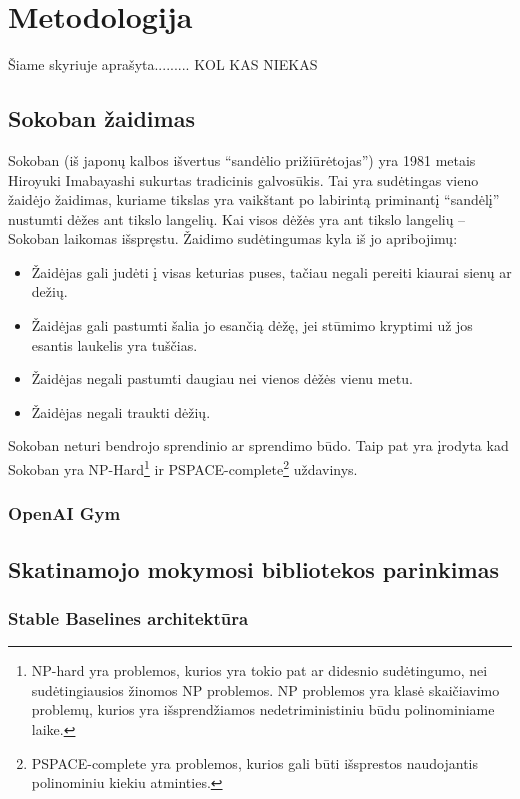 \documentclass{VUMIFPSbakalaurinis}
\begin{document}
\section{Metodologija}
{
	Šiame skyriuje aprašyta......... KOL KAS NIEKAS
}
\subsection{Sokoban žaidimas}
{
	Sokoban (iš japonų kalbos išvertus \enquote{sandėlio prižiūrėtojas}) yra 1981 metais Hiroyuki Imabayashi sukurtas tradicinis galvosūkis. Tai yra sudėtingas vieno žaidėjo žaidimas, kuriame tikslas yra vaikštant po labirintą priminantį \enquote{sandėlį} nustumti dėžes ant tikslo langelių. Kai visos dėžės yra ant tikslo langelių -- Sokoban laikomas išspręstu. Žaidimo sudėtingumas kyla iš jo apribojimų:
	\begin{itemize}
		\item Žaidėjas gali judėti į visas keturias puses, tačiau negali pereiti kiaurai sienų ar dežių.
		\item Žaidėjas gali pastumti šalia jo esančią dėžę, jei stūmimo kryptimi už jos esantis laukelis yra tuščias.
		\item Žaidėjas negali pastumti daugiau nei vienos dėžės vienu metu.
		\item Žaidėjas negali traukti dėžių. 
	\end{itemize}\par
	Sokoban neturi bendrojo sprendinio ar sprendimo būdo. Taip pat yra įrodyta kad Sokoban yra NP-Hard\footnote{NP-hard yra problemos, kurios yra tokio pat ar didesnio sudėtingumo, nei sudėtingiausios žinomos NP problemos. NP problemos yra klasė skaičiavimo problemų, kurios yra išsprendžiamos nedetriministiniu būdu polinominiame laike.} \cite{dor1999sokoban} ir PSPACE-complete\footnote{PSPACE-complete yra problemos, kurios gali būti išsprestos naudojantis polinominiu kiekiu atminties.} \cite{culberson1997sokoban} uždavinys.
}
\subsubsection{OpenAI Gym}
{

}
\subsection{Skatinamojo mokymosi bibliotekos parinkimas}
\subsubsection{Stable Baselines architektūra}
\end{document}

